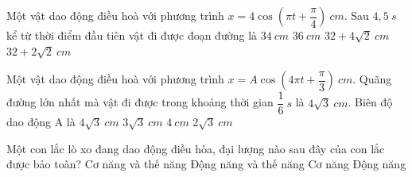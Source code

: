 	\begin{ex}%
		Một vật dao động điều hoà với phương trình $x = 4\cos(\pi t+ \dfrac{\pi}{4})\ cm$. Sau $4,5\ s$ kể từ thời điểm đầu tiên vật đi được đoạn đường là
		\choice
		{$34\ cm$}
		{$36\ cm$}
		{\True $32 + 4\sqrt{2}\ cm$}
		{$32 + 2\sqrt{2}\ cm$}
	\end{ex}
	\begin{ex}%
		Một vật dao động điều hoà với phương trình $x = A\cos(4\pi t +\dfrac{\pi}{3})\ cm$. Quãng đường lớn nhất mà vật đi được trong khoảng thời gian  $\dfrac{1}{6}\ s$ là $4\sqrt{3}\ cm$. Biên độ dao động A là
		\choice
		{$4\sqrt{3}\ cm$}
		{$3\sqrt{3}\ cm$}
		{\True $4\ cm$}
		{$2\sqrt{3}\ cm$}
	\end{ex}
	\begin{ex} %
		Một con lắc lò xo đang dao động điều hòa, đại lượng nào sau đây của con lắc được bảo toàn?
		\choice
		{Cơ năng và thế năng}
		{Động năng và thế năng}
		{\True Cơ năng}
		{Động năng}
	\end{ex}

